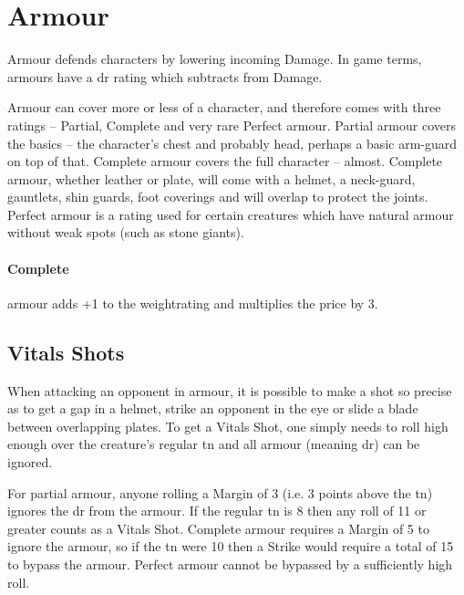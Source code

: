 \section{Armour}

\begin{multicols}{2}

\armourchart

\noindent
Armour defends characters by lowering incoming Damage. In game terms, armours have a \gls{dr} rating which subtracts from Damage.

Armour can cover more or less of a character, and therefore comes with three ratings -- Partial, Complete and very rare Perfect armour.
Partial armour covers the basics -- the character's chest and probably head, perhaps a basic arm-guard on top of that.
Complete armour covers the full character -- almost.
Complete armour, whether leather or plate, will come with a helmet, a neck-guard, gauntlets, shin guards, foot coverings and will overlap to protect the joints.
Perfect armour is a rating used for certain creatures which have natural armour without weak spots (such as stone giants).

\paragraph{Complete} armour adds +1 to the \gls{weightrating} and multiplies the price by 3.

\subsection{Vitals Shots}\label{vitals}

When attacking an opponent in armour, it is possible to make a shot so precise as to get a gap in a helmet, strike an opponent in the eye or slide a blade between overlapping plates. To get a Vitals Shot, one simply needs to roll high enough over the creature's regular \gls{tn} and all armour (meaning \gls{dr}) can be ignored.

For partial armour, anyone rolling a Margin of 3 (i.e. 3 points above the \gls{tn}) ignores the \gls{dr} from the armour. If the regular \gls{tn} is 8 then any roll of 11 or greater counts as a Vitals Shot. Complete armour requires a Margin of 5 to ignore the armour, so if the \gls{tn} were 10 then a Strike would require a total of 15 to bypass the armour. Perfect armour cannot be bypassed by a sufficiently high roll.



\end{multicols}
